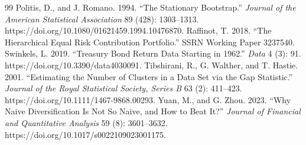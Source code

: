 \documentclass[12pt,letterpaper]{article}
\begin{document}
\begin{thebibliography}{99}
 Politis, D., and J. Romano. 1994. ``The Stationary Bootstrap.'' \emph{Journal of the American Statistical Association} 89 (428): 1303–1313. https://doi.org/10.1080/01621459.1994.10476870.
 Raffinot, T. 2018. ``The Hierarchical Equal Risk Contribution Portfolio.'' SSRN Working Paper 3237540.
 Swinkels, L. 2019. ``Treasury Bond Return Data Starting in 1962.'' \emph{Data} 4 (3): 91. https://doi.org/10.3390/data4030091.
 Tibshirani, R., G. Walther, and T. Hastie. 2001. ``Estimating the Number of Clusters in a Data Set via the Gap Statistic.'' \emph{Journal of the Royal Statistical Society, Series B} 63 (2): 411–423. https://doi.org/10.1111/1467-9868.00293.
 Yuan, M., and G. Zhou. 2023. ``Why Naive Diversification Is Not So Naive, and How to Beat It?'' \emph{Journal of Financial and Quantitative Analysis} 59 (8): 3601–3632. https://doi.org/10.1017/s0022109023001175.
\end{thebibliography}
\end{document}
